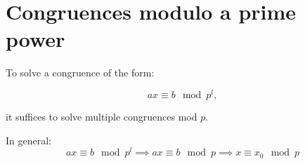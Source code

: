 \documentclass{article}
\begin{document}
    \section*{Congruences modulo a prime power}
    To solve a congruence of the form:

    \begin{equation*}
    ax \equiv b \mod p^l,
    \end{equation*}

    it suffices to solve multiple congruences mod $p$.

    In general:
    \begin{equation*}
    ax \equiv b \mod p^l \implies ax \equiv b \mod p \implies x \equiv x_0 \mod p
    \end{equation*}

    
\end{document}
